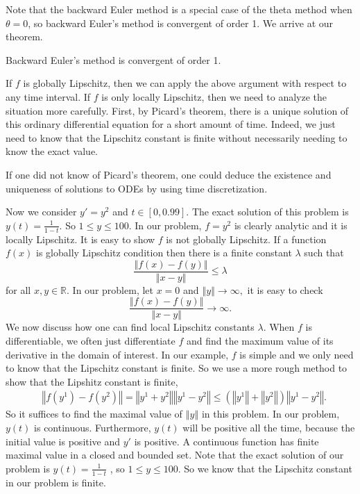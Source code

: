 Note that the backward Euler method is a special case of the theta method when $\theta=0$, so backward Euler's method is convergent of order 1. We arrive at our theorem.

\begin{theorem}
Backward Euler's method is convergent of order 1.
\end{theorem}

\begin{remark}
If $f$ is globally Lipschitz, then we can apply the above argument with respect to any time interval. If $f$ is only locally Lipschitz, then we need to analyze the situation more carefully. First, by Picard's theorem,  there is a unique solution of this ordinary differential equation for a short amount of time.  Indeed, we just need to know that the Lipschitz constant is finite without necessarily needing to know the exact value.
\end{remark}

\begin{remark} If one did not know of Picard's theorem, one could deduce the existence and uniqueness of solutions to ODEs by using time discretization.
\end{remark}

Now we consider $y'=y^{2}$ and $t\in[0,0.99]$. The exact solution of this problem is $y(t)=\frac{1}{1-t}$. So $1\leq y\leq100$. In our problem, $f=y^{2}$ is clearly analytic and it is locally Lipschitz. It is easy to show $f$ is not globally Lipschitz. If a function $f(x)$ is globally Lipschitz condition then there is a finite constant $\lambda$ such that 
\begin{equation}
\frac{\left\Vert f(x)-f(y)\right\Vert }{\left\Vert x-y\right\Vert }\leq\lambda
\end{equation}
for all $x,y\in \mathbb{R}$. In our problem, let $x=0$ and $\left\Vert y\right\Vert \rightarrow\infty,$ it is easy to check 
\begin{equation}
\frac{\left\Vert f(x)-f(y)\right\Vert }{\left\Vert x-y\right\Vert }\rightarrow\infty.
\end{equation}
We now discuss how one can find local Lipschitz constants $\lambda$. When $f$  is differentiable, we often just differentiate $f$ and find the maximum value of its derivative in the domain of interest. In our example, $f$ is simple and we only need to know that the Lipschitz constant is finite. So we use a more rough method to show that the Lipshitz constant is finite,
\begin{align}
&{}\left\Vert f(y^{1})-f(y^{2})\right\Vert 
=\left\Vert y^{1}+y^{2}\right\Vert \left\Vert y^{1}-y^{2}\right\Vert \leq\left(\left\Vert y^{1}\right\Vert +\left\Vert y^{2}\right\Vert\right)\left\Vert y^{1}-y^{2}\right\Vert. 
\end{align}
So it suffices to find the maximal value of $\left\Vert y\right\Vert$ in this problem. In our problem, $y(t)$ is continuous. Furthermore, $y(t)$ will be positive all the time, because the initial value is positive and $y'$ is positive. A continuous function has finite maximal value in a closed and bounded set. Note that the exact solution of our problem is $y(t)=\frac{1}{1-t}$ , so $1\leq y\leq100$. So we know that the Lipschitz constant in our problem is finite.

